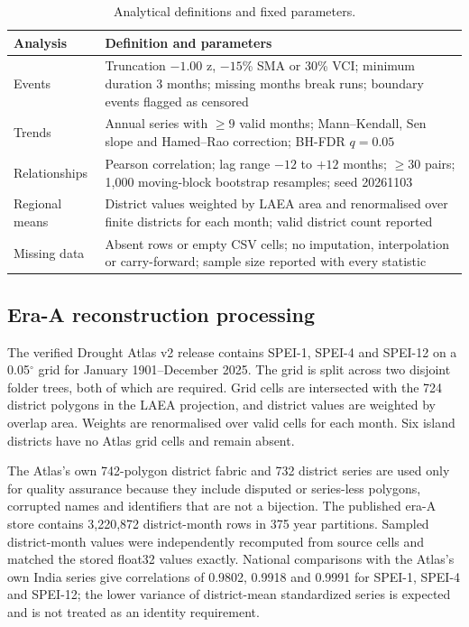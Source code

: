 \documentclass[11pt,a4paper]{article}
\begin{document}
\begin{table}[t]
\caption{Analytical definitions and fixed parameters.}
\small
\begin{tabularx}{\textwidth}{@{}>{\RaggedRight\arraybackslash}p{}>{\RaggedRight\arraybackslash}X@{}}
\toprule
Analysis & Definition and parameters \\
\midrule
Events & Truncation $-1.00$ z, $-15$\% SMA or 30\% VCI; minimum duration 3 months; missing months break runs; boundary events flagged as censored \\
Trends & Annual series with $\ge9$ valid months; Mann--Kendall, Sen slope and Hamed--Rao correction; BH-FDR $q=0.05$ \\
Relationships & Pearson correlation; lag range $-12$ to $+12$ months; $\ge30$ pairs; 1,000 moving-block bootstrap resamples; seed 20261103 \\
Regional means & District values weighted by LAEA area and renormalised over finite districts for each month; valid district count reported \\
Missing data & Absent rows or empty CSV cells; no imputation, interpolation or carry-forward; sample size reported with every statistic \\
\bottomrule
\end{tabularx}
\end{table}

\subsection*{Era-A reconstruction processing}
The verified Drought Atlas v2 release contains SPEI-1, SPEI-4 and SPEI-12 on a 0.05$^\circ$ grid for January 1901--December 2025\citep{ChuphalData2024}. The grid is split across two disjoint folder trees, both of which are required. Grid cells are intersected with the 724 district polygons in the LAEA projection, and district values are weighted by overlap area. Weights are renormalised over valid cells for each month. Six island districts have no Atlas grid cells and remain absent.

The Atlas's own 742-polygon district fabric and 732 district series are used only for quality assurance because they include disputed or series-less polygons, corrupted names and identifiers that are not a bijection. The published era-A store contains 3,220,872 district-month rows in 375 year partitions. Sampled district-month values were independently recomputed from source cells and matched the stored float32 values exactly. National comparisons with the Atlas's own India series give correlations of 0.9802, 0.9918 and 0.9991 for SPEI-1, SPEI-4 and SPEI-12; the lower variance of district-mean standardized series is expected and is not treated as an identity requirement.
\end{document}
